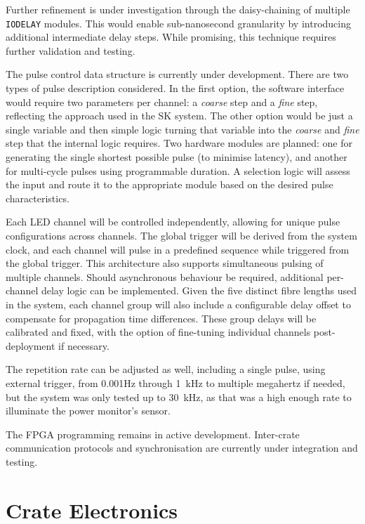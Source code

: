 \documentclass[a4paper,11pt]{article}
\begin{document}
Further refinement is under investigation through the daisy-chaining of multiple \texttt{IODELAY} modules. This would enable sub-nanosecond granularity by introducing additional intermediate delay steps. While promising, this technique requires further validation and testing.

The pulse control data structure is currently under development. There are two types of pulse description considered. In the first option, the software interface would require two parameters per channel: a \textit{coarse} step and a \textit{fine} step, reflecting the approach used in the SK system. The other option would be just a single variable and then simple logic turning that variable into the \textit{coarse} and \textit{fine} step that the internal logic requires. Two hardware modules are planned: one for generating the single shortest possible pulse (to minimise latency), and another for multi-cycle pulses using programmable duration. A selection logic will assess the input and route it to the appropriate module based on the desired pulse characteristics.

Each LED channel will be controlled independently, allowing for unique pulse configurations across channels. The global trigger will be derived from the system clock, and each channel will pulse in a predefined sequence while triggered from the global trigger. This architecture also supports simultaneous pulsing of multiple channels. Should asynchronous behaviour be required, additional per-channel delay logic can be implemented. Given the five distinct fibre lengths used in the system, each channel group will also include a configurable delay offset to compensate for propagation time differences. These group delays will be calibrated and fixed, with the option of fine-tuning individual channels post-deployment if necessary.

The repetition rate can be adjusted as well, including a single pulse, using external trigger, from 0.001Hz through 1~kHz to multiple megahertz if needed, but the system was only tested up to  30~kHz, as that was a high enough rate to illuminate the power monitor's sensor.

The FPGA programming remains in active development. Inter-crate communication protocols and synchronisation are currently under integration and testing.

\section{Crate Electronics}\label{sec:crate}
\end{document}
